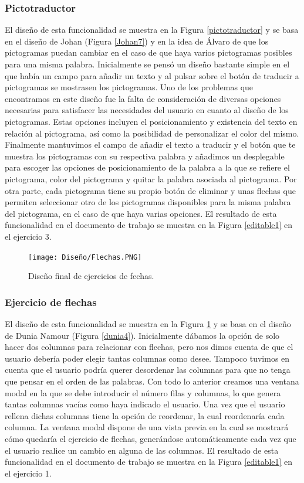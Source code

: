 \subsubsection{Pictotraductor}
El diseño de esta funcionalidad se muestra en la Figura \ref{pictotraductor} y se basa en el diseño de Johan (Figura \ref{Johan7}) y en la idea de Álvaro de que los pictogramas puedan cambiar en el caso de que haya varios pictogramas posibles para una misma palabra. Inicialmente se pensó un diseño bastante simple en el que había un campo para añadir un texto y al pulsar sobre el botón de traducir a pictogramas se mostrasen los pictogramas. Uno de los problemas que encontramos en este diseño fue la falta de consideración de diversas opciones necesarias para satisfacer las necesidades del usuario en cuanto al diseño de los pictogramas. Estas opciones incluyen el posicionamiento y existencia del texto en relación al pictograma, así como la posibilidad de personalizar el color del mismo. Finalmente mantuvimos el campo de añadir el texto a traducir y el botón que te muestra los pictogramas con su respectiva palabra y añadimos un desplegable para escoger las opciones de posicionamiento de la palabra a la que se refiere el pictograma, color del pictograma y quitar la palabra asociada al pictograma. Por otra parte, cada pictograma tiene su propio botón de eliminar y unas flechas que permiten seleccionar otro de los pictogramas disponibles para la misma palabra del pictograma, en el caso de que haya varias opciones. El resultado de esta funcionalidad en el documento de trabajo se muestra en la Figura \ref{editable1} en el ejercicio 3.

\begin{figure}[ht!]
  \centering
  \texttt{[image: Diseño/Flechas.PNG]}
  \caption{Diseño final de ejercicios de fechas.}
  \label{flechas}
\end{figure}

\subsubsection{Ejercicio de flechas}
El diseño de esta funcionalidad se muestra en la Figura \ref{flechas} y se basa en el diseño de Dunia Namour (Figura \ref{dunia4}). Inicialmente dábamos la opción de solo hacer dos columnas para relacionar con flechas, pero nos dimos cuenta de que el usuario debería poder elegir tantas columnas como desee. Tampoco tuvimos en cuenta que el usuario podría querer desordenar las columnas para que no tenga que pensar en el orden de las palabras. Con todo lo anterior creamos una ventana modal en la que se debe introducir el número filas y columnas, lo que genera tantas columnas vacías como haya indicado el usuario. Una vez que el usuario rellena dichas columnas tiene la opción de reordenar, la cual reordenaría cada columna. La ventana modal dispone de una vista previa en la cual se mostrará cómo quedaría el ejercicio de flechas, generándose automáticamente cada vez que el usuario realice un cambio en alguna de las columnas. El resultado de esta funcionalidad en el documento de trabajo se muestra en la Figura \ref{editable1} en el ejercicio 1.


